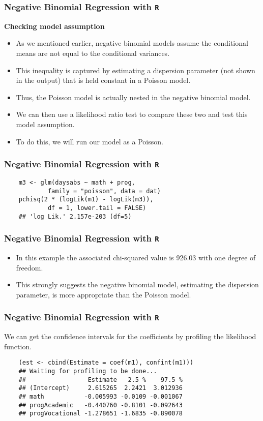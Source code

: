 \documentclass[00-GLMregslides.tex]{subfiles}
\begin{document}
\begin{frame}[fragile]
	\frametitle{Negative Binomial Regression with \texttt{R} }
	\Large
	
	\textbf{Checking model assumption}
\begin{itemize}
	\item	
	As we mentioned earlier, negative binomial models assume the conditional means are not equal to the conditional 
	variances. 
	\item This inequality is captured by estimating a dispersion parameter (not shown in the output) that is held
	constant in a Poisson model. 
	\item Thus, the Poisson model is actually nested in the negative binomial model. 
	\item We can then use a likelihood ratio test to compare these two and test this model assumption. 
	\item To do this, we will run our model as a Poisson.
\end{itemize}
\end{frame}
\begin{frame}[fragile]
	\frametitle{Negative Binomial Regression with \texttt{R} }
	\large
	\begin{verbatim}
	m3 <- glm(daysabs ~ math + prog, 
	        family = "poisson", data = dat)
	pchisq(2 * (logLik(m1) - logLik(m3)), 
	        df = 1, lower.tail = FALSE)
	## 'log Lik.' 2.157e-203 (df=5)
	\end{verbatim}
	\Large
	\end{frame}
\begin{frame}[fragile]
\frametitle{Negative Binomial Regression with \texttt{R} }
\large	
\begin{itemize}
\item		
In this example the associated chi-squared value is 926.03 with one degree of freedom. 
\item This strongly suggests the negative binomial model, estimating the dispersion parameter, is more appropriate than the Poisson model.
\end{itemize}
\end{frame}
\begin{frame}[fragile]
	\frametitle{Negative Binomial Regression with \texttt{R} }
	\Large
	
	We can get the confidence intervals for the coefficients by profiling the likelihood function.
	\begin{verbatim}
	(est <- cbind(Estimate = coef(m1), confint(m1)))
	## Waiting for profiling to be done...
	##                 Estimate   2.5 %    97.5 %
	## (Intercept)     2.615265  2.2421  3.012936
	## math           -0.005993 -0.0109 -0.001067
	## progAcademic   -0.440760 -0.8101 -0.092643
	## progVocational -1.278651 -1.6835 -0.890078
	\end{verbatim}
	
\end{frame}
\end{document}

